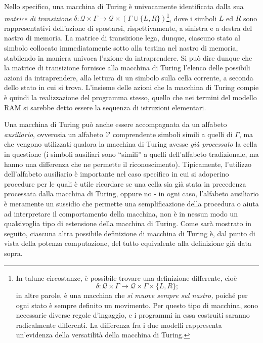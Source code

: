 \documentclass[10pt]{book}
\begin{document}
Nello specifico, una macchina di Turing è univocamente identificata dalla sua
\emph{matrice di transizione} $\delta  : \mathcal Q \times \Gamma \rightarrow
\mathcal Q \times (\Gamma \cup \{L,R\})$\footnote{In talune circostanze, è
possibile trovare una definizione differente, cioè $$\delta  : \mathcal Q \times
\Gamma \rightarrow \mathcal Q \times \Gamma \times \{L,R\};$$ in altre parole, è
una macchina che \emph{si muove sempre sul nastro,} poiché per ogni stato è
sempre definito un movimento. Per questo tipo di macchina, sono necessarie
diverse regole d'ingaggio, e i programmi in essa costruiti saranno radicalmente
differenti. La differenza fra i due modelli rappresenta un'evidenza della
versatilità della macchina di Turing.}, dove i simboli $L$ ed $R$ sono
rappresentativi dell'azione di spostarsi, rispettivamente, a sinistra e a
destra del nastro di memoria. La matrice di transizione lega, dunque, ciascuno
stato al simbolo collocato immediatamente sotto alla testina nel nastro di
memoria, stabilendo in maniera univoca l'azione da intraprendere. Si può dire
dunque che la matrice di transizione fornisce alla macchina di Turing l'elenco
delle possibili azioni da intraprendere, alla lettura di un simbolo sulla cella
corrente, a seconda dello stato in cui si trova. L'insieme delle azioni che la
macchina di Turing compie è quindi la realizzazione del programma stesso,
quello che nei termini del modello RAM si sarebbe detto essere la sequenza di
istruzioni elementari.

Una macchina di Turing può anche essere accompagnata da un alfabeto
\emph{ausiliario}, ovverosia un alfabeto $\mathcal V$ comprendente simboli
simili a quelli di $\Gamma$, ma che vengono utilizzati qualora la macchina di
Turing avesse \emph{già processato} la cella in questione (i simboli ausiliari
sono ``simili'' a quelli dell'alfabeto tradizionale, ma hanno una differenza
che ne permette il riconoscimento). Tipicamente, l'utilizzo dell'alfabeto
ausiliario è importante nel caso specifico in cui si adoperino procedure per le
quali è utile ricordare se una cella sia già stata in precedenza processata
dalla macchina di Turing, oppure no \-- in ogni caso, l'alfabeto ausiliario è
meramente un sussidio che permette una semplificazione della procedura o aiuta
ad interpretare il comportamento della macchina, non è in nessun modo un
qualsivoglia tipo di estensione della macchina di Turing. Come sarà mostrato in
seguito, ciascuna altra possibile definizione di macchina di Turing è, dal
punto di vista della potenza computazione, del tutto equivalente alla
definizione già data sopra.
\end{document}
